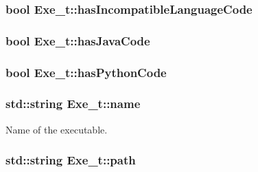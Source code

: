 \subsubsection[{\texorpdfstring{has\+Incompatible\+Language\+Code}{hasIncompatibleLanguageCode}}]{\setlength{\rightskip}{0pt plus 5cm}bool Exe\+\_\+t\+::has\+Incompatible\+Language\+Code}\hypertarget{struct_exe__t_a38ca62ce5704d663f662eeb01a52d218}{}\label{struct_exe__t_a38ca62ce5704d663f662eeb01a52d218}
\subsubsection[{\texorpdfstring{has\+Java\+Code}{hasJavaCode}}]{\setlength{\rightskip}{0pt plus 5cm}bool Exe\+\_\+t\+::has\+Java\+Code}\hypertarget{struct_exe__t_a27e0b8ce760ab7ee4a2849f81b8e4d79}{}\label{struct_exe__t_a27e0b8ce760ab7ee4a2849f81b8e4d79}
\subsubsection[{\texorpdfstring{has\+Python\+Code}{hasPythonCode}}]{\setlength{\rightskip}{0pt plus 5cm}bool Exe\+\_\+t\+::has\+Python\+Code}\hypertarget{struct_exe__t_a122a61836fa54589d50f5df71b497302}{}\label{struct_exe__t_a122a61836fa54589d50f5df71b497302}
\subsubsection[{\texorpdfstring{name}{name}}]{\setlength{\rightskip}{0pt plus 5cm}std\+::string Exe\+\_\+t\+::name}\hypertarget{struct_exe__t_adf6873ec528b52a18ccc584d14aab672}{}\label{struct_exe__t_adf6873ec528b52a18ccc584d14aab672}


Name of the executable. 

\subsubsection[{\texorpdfstring{path}{path}}]{\setlength{\rightskip}{0pt plus 5cm}std\+::string Exe\+\_\+t\+::path}\hypertarget{struct_exe__t_a5f311cf3cbce5d5bc6530ea23a56a1ee}{}\label{struct_exe__t_a5f311cf3cbce5d5bc6530ea23a56a1ee}


